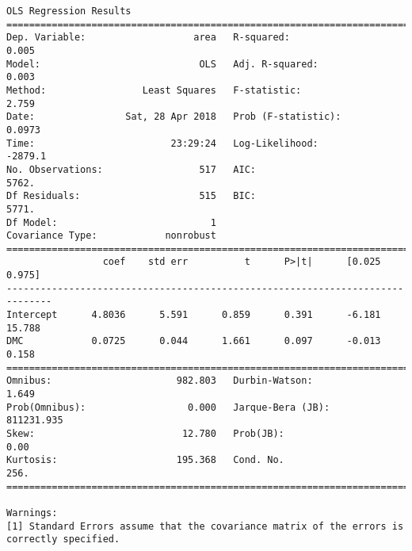 \documentclass[11pt]{article}
\begin{document}
\begin{Verbatim}[commandchars=\\\{\}]
                            OLS Regression Results                            
==============================================================================
Dep. Variable:                   area   R-squared:                       0.005
Model:                            OLS   Adj. R-squared:                  0.003
Method:                 Least Squares   F-statistic:                     2.759
Date:                Sat, 28 Apr 2018   Prob (F-statistic):             0.0973
Time:                        23:29:24   Log-Likelihood:                -2879.1
No. Observations:                 517   AIC:                             5762.
Df Residuals:                     515   BIC:                             5771.
Df Model:                           1                                         
Covariance Type:            nonrobust                                         
==============================================================================
                 coef    std err          t      P>|t|      [0.025      0.975]
------------------------------------------------------------------------------
Intercept      4.8036      5.591      0.859      0.391      -6.181      15.788
DMC            0.0725      0.044      1.661      0.097      -0.013       0.158
==============================================================================
Omnibus:                      982.803   Durbin-Watson:                   1.649
Prob(Omnibus):                  0.000   Jarque-Bera (JB):           811231.935
Skew:                          12.780   Prob(JB):                         0.00
Kurtosis:                     195.368   Cond. No.                         256.
==============================================================================

Warnings:
[1] Standard Errors assume that the covariance matrix of the errors is correctly specified.



\end{Verbatim}
\end{document}

